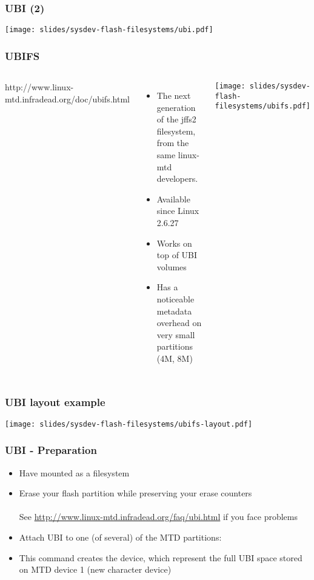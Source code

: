 \begin{frame}
  \frametitle{UBI (2)}
  \begin{center}
    \texttt{[image: slides/sysdev-flash-filesystems/ubi.pdf]}
  \end{center}
\end{frame}

\begin{frame}
  \frametitle{UBIFS}
  \begin{columns}
    http://www.linux-mtd.infradead.org/doc/ubifs.html
    \begin{itemize}
    \item The next generation of the jffs2 filesystem, from the same
      linux-mtd developers.
    \item Available since Linux 2.6.27
    \item Works on top of UBI volumes
    \item Has a noticeable metadata overhead on very small partitions
      (4M, 8M)
    \end{itemize}
    \texttt{[image: slides/sysdev-flash-filesystems/ubifs.pdf]}
  \end{columns}
\end{frame}

\begin{frame}
  \frametitle{UBI layout example}
  \begin{center}
    \texttt{[image: slides/sysdev-flash-filesystems/ubifs-layout.pdf]}
  \end{center}
\end{frame}

\begin{frame}
  \frametitle{UBI - Preparation}
  \begin{itemize}
  \item Have  mounted as a  filesystem
  \item Erase your flash partition while preserving your erase counters\\
    \\
    See \url{http://www.linux-mtd.infradead.org/faq/ubi.html} if you
    face problems
  \item Attach UBI to one (of several) of the MTD partitions:\\
  \item This command creates the  device, which represent
    the full UBI space stored on MTD device 1 (new 
    character device)
  \end{itemize}
\end{frame}

